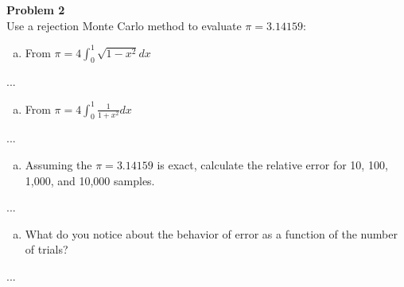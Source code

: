 \documentclass[10pt]{article}
\begin{document}
%
%
%

\newpage
\noindent \textbf{Problem 2}\\
Use a rejection Monte Carlo method to evaluate $\pi = 3.14159$:

\begin{enumerate}[(a)]
	\item From $\pi = 4 \int_0^1 \sqrt{1-x^2} dx$
\end{enumerate}

...

%
%
%

\begin{enumerate}[(b)]
	\item From $\pi = 4 \int_0^1 \frac{1}{1+x^2} dx$
\end{enumerate}

...

%
%
%

\begin{enumerate}[(c)]
	\item Assuming the $\pi = 3.14159$ is exact, calculate the relative error for 10, 100, 1,000, and 10,000 samples.
\end{enumerate}

...

%
%
%

\begin{enumerate}[(d)]
	\item What do you notice about the behavior of error as a function of the number of trials?
\end{enumerate}

...

%
%
%


\end{document}
